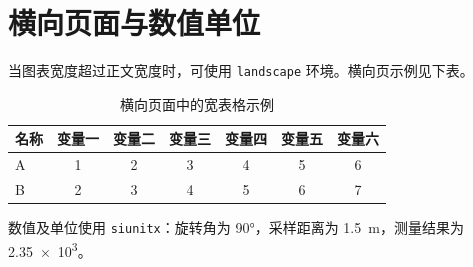 \section{横向页面与数值单位}
当图表宽度超过正文宽度时，可使用 \verb|landscape| 环境。横向页示例见下表。
\begin{landscape}
\begin{table}[htbp]
  \centering
  \caption{横向页面中的宽表格示例}
  \label{tab:demo-landscape}
  \begin{tabular}{lcccccc}
    \toprule
    名称 & 变量一 & 变量二 & 变量三 & 变量四 & 变量五 & 变量六 \\
    \midrule
    A & 1 & 2 & 3 & 4 & 5 & 6 \\
    B & 2 & 3 & 4 & 5 & 6 & 7 \\
    \bottomrule
  \end{tabular}
\end{table}
\end{landscape}

数值及单位使用 \texttt{siunitx}：旋转角为 \ang{90}，采样距离为 \SI{1.5}{\metre}，测量结果为 \num{2.35e3}。
